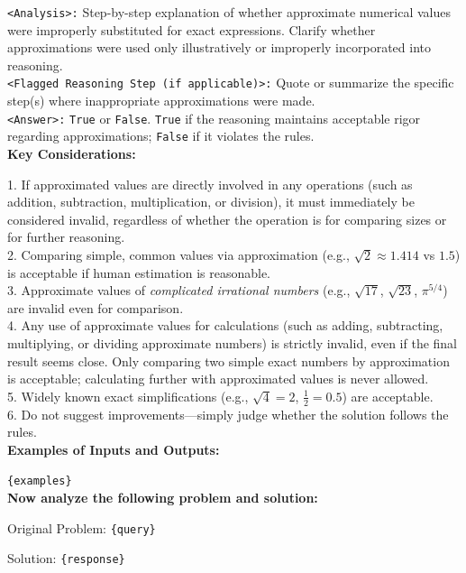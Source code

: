 \begin{textcolorbox}
\texttt{<Analysis>:} Step-by-step explanation of whether approximate numerical values were improperly substituted for exact expressions. Clarify whether approximations were used only illustratively or improperly incorporated into reasoning.\\
\texttt{<Flagged Reasoning Step (if applicable)>:} Quote or summarize the specific step(s) where inappropriate approximations were made.\\
\texttt{<Answer>:} \texttt{True} or \texttt{False}. \texttt{True} if the reasoning maintains acceptable rigor regarding approximations; \texttt{False} if it violates the rules.\\

\textbf{Key Considerations:}

1. If approximated values are directly involved in any operations (such as addition, subtraction, multiplication, or division), it must immediately be considered invalid, regardless of whether the operation is for comparing sizes or for further reasoning.\\
2. Comparing simple, common values via approximation (e.g., $\sqrt{2} \approx 1.414$ vs $1.5$) is acceptable if human estimation is reasonable.\\
3. Approximate values of \textit{complicated irrational numbers} (e.g., $\sqrt{17}$, $\sqrt{23}$, $\pi^{5/4}$) are invalid even for comparison.\\
4. Any use of approximate values for calculations (such as adding, subtracting, multiplying, or dividing approximate numbers) is strictly invalid, even if the final result seems close. Only comparing two simple exact numbers by approximation is acceptable; calculating further with approximated values is never allowed.\\
5. Widely known exact simplifications (e.g., $\sqrt{4}=2$, $\frac{1}{2}=0.5$) are acceptable.\\
6. Do not suggest improvements—simply judge whether the solution follows the rules.\\

\textbf{Examples of Inputs and Outputs:}

\texttt{\{examples\}}\\

\textbf{Now analyze the following problem and solution:}

Original Problem:
\texttt{\{query\}}

Solution:
\texttt{\{response\}}

\end{textcolorbox}










